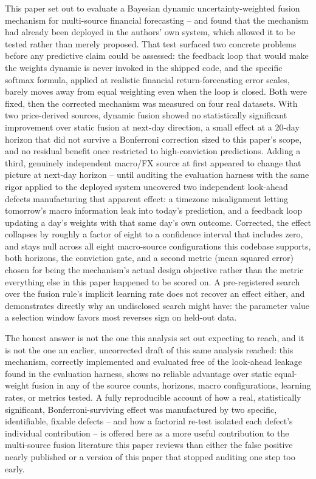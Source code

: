 \documentclass[10pt,a4paper,twocolumn]{article}
\begin{document}
This paper set out to evaluate a Bayesian dynamic uncertainty-weighted fusion mechanism for multi-source financial forecasting -- and found that the mechanism had already been deployed in the authors' own system, which allowed it to be tested rather than merely proposed. That test surfaced two concrete problems before any predictive claim could be assessed: the feedback loop that would make the weights dynamic is never invoked in the shipped code, and the specific softmax formula, applied at realistic financial return-forecasting error scales, barely moves away from equal weighting even when the loop is closed. Both were fixed, then the corrected mechanism was measured on four real datasets. With two price-derived sources, dynamic fusion showed no statistically significant improvement over static fusion at next-day direction, a small effect at a 20-day horizon that did not survive a Bonferroni correction sized to this paper's scope, and no residual benefit once restricted to high-conviction predictions. Adding a third, genuinely independent macro/FX source at first appeared to change that picture at next-day horizon -- until auditing the evaluation harness with the same rigor applied to the deployed system uncovered two independent look-ahead defects manufacturing that apparent effect: a timezone misalignment letting tomorrow's macro information leak into today's prediction, and a feedback loop updating a day's weights with that same day's own outcome. Corrected, the effect collapses by roughly a factor of eight to a confidence interval that includes zero, and stays null across all eight macro-source configurations this codebase supports, both horizons, the conviction gate, and a second metric (mean squared error) chosen for being the mechanism's actual design objective rather than the metric everything else in this paper happened to be scored on. A pre-registered search over the fusion rule's implicit learning rate does not recover an effect either, and demonstrates directly why an undisclosed search might have: the parameter value a selection window favors most reverses sign on held-out data.

The honest answer is not the one this analysis set out expecting to reach, and it is not the one an earlier, uncorrected draft of this same analysis reached: this mechanism, correctly implemented and evaluated free of the look-ahead leakage found in the evaluation harness, shows no reliable advantage over static equal-weight fusion in any of the source counts, horizons, macro configurations, learning rates, or metrics tested. A fully reproducible account of how a real, statistically significant, Bonferroni-surviving effect was manufactured by two specific, identifiable, fixable defects -- and how a factorial re-test isolated each defect's individual contribution -- is offered here as a more useful contribution to the multi-source fusion literature this paper reviews than either the false positive nearly published or a version of this paper that stopped auditing one step too early.
\end{document}
